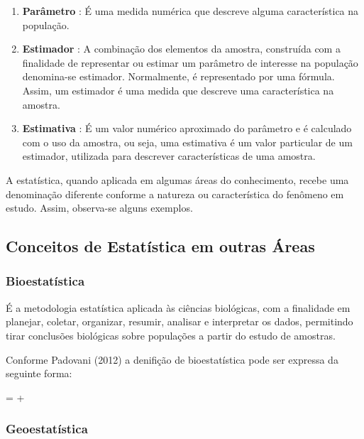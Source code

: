 \begin{enumerate}
\item \textbf{Parâmetro} : É uma medida numérica que descreve alguma característica na população.

\item \textbf{Estimador} : A combinação dos elementos da amostra,
construída com a finalidade de representar ou estimar um
parâmetro de interesse na população denomina-se estimador.
Normalmente, é representado por uma fórmula. Assim, um
estimador é uma medida que descreve uma característica na amostra.


\item \textbf{Estimativa} : É um valor numérico aproximado do
parâmetro e é calculado com o uso da amostra, ou seja, uma
estimativa é um valor particular de um estimador, utilizada para descrever características de uma amostra.
\end{enumerate}


A estatística, quando aplicada em algumas áreas do conhecimento,
recebe uma denominação diferente conforme a natureza ou
característica do fenômeno em estudo. Assim, observa-se alguns
exemplos.



\subsection{Conceitos de Estatística em outras Áreas}
\subsubsection{Bioestatística}

É a metodologia estatística aplicada às ciências biológicas, com a finalidade em planejar, coletar, organizar, resumir, analisar e interpretar os dados,
permitindo tirar conclusões biológicas sobre populações a partir do estudo
de amostras.\vskip0.3cm

Conforme Padovani (2012) a denifição de bioestatística pode ser expressa da seguinte forma:

\begin{center}
 =  + 
\end{center}


\subsubsection{Geoestatística} 

